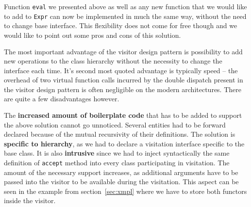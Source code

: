 \documentclass[preprint]{sigplanconf}
\DeclareRobustCommand{\code}[1]{{\lstinline[breaklines=false]{#1}}}
\begin{document}
Function \code{eval} we presented above as well as any new function that we 
would like to add to \code{Expr} can now be implemented in much the same way, 
without the need to change base interface. This flexibility does not come for 
free though and we would like to point out some pros and cons of this solution.

The most important advantage of the visitor design pattern is possibility to add 
new operations to the class hierarchy without the necessity to change the 
interface each time. It's second most quoted advantage is typically speed -- the 
overhead of two virtual function calls incurred by the double dispatch present 
in the visitor design pattern is often negligible on the modern architectures. 
There are quite a few disadvantages however.

The {\bf increased amount of boilerplate code} that has to be added to support 
the above solution cannot go unnoticed. Several entities had to be forward 
declared because of the mutual recursivity of their definitions. The solution is 
{\bf specific to hierarchy}, as we had to declare a visitation interface 
specific to the base class. It is also {\bf intrusive} since we had to inject 
syntactically the same definition of \code{accept} method into every class 
participating in visitation. The amount of the necessary support increases, as 
additional arguments have to be passed into the visitor to be available during 
the visitation. This aspect can be seen in the example from 
section~\ref{sec:xmpl} where we have to store both functors inside the visitor.  
\end{document}

